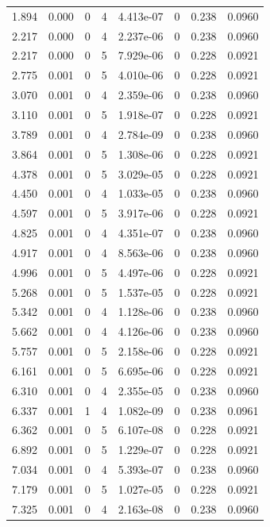 \documentclass[preview]{standalone}
\begin{document}
{{\begin{tabular}{L{1.2cm}C{1.2cm} C{0.3cm}C{0.5cm} C{1.4cm}C{1.4cm} C{1.4cm}C{1.4cm}}
  1.894  &  0.000  & 0     &  4 &  4.413e-07  & 0  & 0.238 &  0.0960   \\ 
  2.217  &  0.000  & 0     &  4 &  2.237e-06  & 0  & 0.238 &  0.0960   \\ 
  2.217  &  0.000  & 0     &  5 &  7.929e-06  & 0  & 0.228 &  0.0921   \\ 
  2.775  &  0.001  & 0     &  5 &  4.010e-06  & 0  & 0.228 &  0.0921   \\ 
  3.070  &  0.001  & 0     &  4 &  2.359e-06  & 0  & 0.238 &  0.0960   \\ 
  3.110  &  0.001  & 0     &  5 &  1.918e-07  & 0  & 0.228 &  0.0921   \\ 
  3.789  &  0.001  & 0     &  4 &  2.784e-09  & 0  & 0.238 &  0.0960   \\ 
  3.864  &  0.001  & 0     &  5 &  1.308e-06  & 0  & 0.228 &  0.0921   \\ 
  4.378  &  0.001  & 0     &  5 &  3.029e-05  & 0  & 0.228 &  0.0921   \\ 
  4.450  &  0.001  & 0     &  4 &  1.033e-05  & 0  & 0.238 &  0.0960   \\ 
  4.597  &  0.001  & 0     &  5 &  3.917e-06  & 0  & 0.228 &  0.0921   \\ 
  4.825  &  0.001  & 0     &  4 &  4.351e-07  & 0  & 0.238 &  0.0960   \\ 
  4.917  &  0.001  & 0     &  4 &  8.563e-06  & 0  & 0.238 &  0.0960   \\ 
  4.996  &  0.001  & 0     &  5 &  4.497e-06  & 0  & 0.228 &  0.0921   \\ 
  5.268  &  0.001  & 0     &  5 &  1.537e-05  & 0  & 0.228 &  0.0921   \\ 
  5.342  &  0.001  & 0     &  4 &  1.128e-06  & 0  & 0.238 &  0.0960   \\ 
  5.662  &  0.001  & 0     &  4 &  4.126e-06  & 0  & 0.238 &  0.0960   \\ 
  5.757  &  0.001  & 0     &  5 &  2.158e-06  & 0  & 0.228 &  0.0921   \\ 
  6.161  &  0.001  & 0     &  5 &  6.695e-06  & 0  & 0.228 &  0.0921   \\ 
  6.310  &  0.001  & 0     &  4 &  2.355e-05  & 0  & 0.238 &  0.0960   \\ 
  6.337  &  0.001  & 1     &  4 &  1.082e-09  & 0  & 0.238 &  0.0961   \\ 
  6.362  &  0.001  & 0     &  5 &  6.107e-08  & 0  & 0.228 &  0.0921   \\ 
  6.892  &  0.001  & 0     &  5 &  1.229e-07  & 0  & 0.228 &  0.0921   \\ 
  7.034  &  0.001  & 0     &  4 &  5.393e-07  & 0  & 0.238 &  0.0960   \\ 
  7.179  &  0.001  & 0     &  5 &  1.027e-05  & 0  & 0.228 &  0.0921   \\ 
  7.325  &  0.001  & 0     &  4 &  2.163e-08  & 0  & 0.238 &  0.0960   \\ 
\hline 
\end{tabular} 

}}
\end{document}
